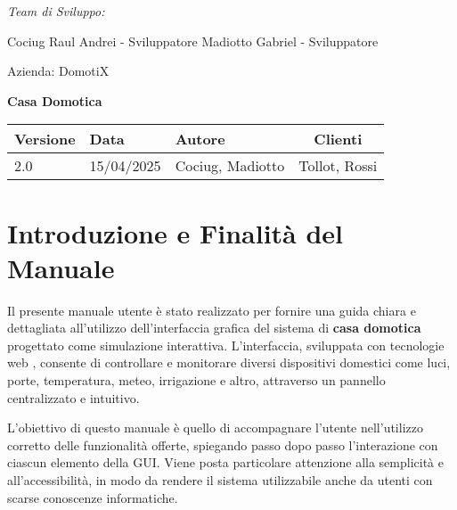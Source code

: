 \documentclass[a4paper,12pt]{article}
\begin{document}
\begin{titlepage}
    \begin{minipage}[t]{0.4\textwidth}
    \raggedright
    {\large\itshape Team di Sviluppo:\par}
    \vspace{0.2cm}
    
    Cociug Raul Andrei - Sviluppatore 
    Madiotto Gabriel - Sviluppatore
    \end{minipage}
    \hfill
    \begin{minipage}[t]{0.4\textwidth}
    \raggedleft
    {\Large Azienda: DomotiX\par}
    \end{minipage}
    
    \centering
    \vspace*{5cm}
    
    {\Huge\bfseries Casa Domotica\par}
    \vspace{1.5cm}
    
    \vfill
    
    \begin{table}[h]
    \centering
    \begin{tabular}{@{}lllc@{}}
    \toprule
    Versione & Data & Autore & Clienti \\  
    \midrule
    2.0 & 15/04/2025 & Cociug, Madiotto & Tollot, Rossi \\
    \bottomrule
    \end{tabular}
    \end{table}
    
    \thispagestyle{empty}
\end{titlepage}
\tableofcontents
\newpage

\section{Introduzione e Finalità del Manuale}

Il presente manuale utente è stato realizzato per fornire una guida chiara e dettagliata all'utilizzo dell’interfaccia grafica del sistema di \textbf{casa domotica} progettato come simulazione interattiva. L’interfaccia, sviluppata con tecnologie web , consente di controllare e monitorare diversi dispositivi domestici come luci, porte, temperatura, meteo, irrigazione e altro, attraverso un pannello centralizzato e intuitivo.

L’obiettivo di questo manuale è quello di accompagnare l’utente nell’utilizzo corretto delle funzionalità offerte, spiegando passo dopo passo l’interazione con ciascun elemento della GUI. Viene posta particolare attenzione alla semplicità e all’accessibilità, in modo da rendere il sistema utilizzabile anche da utenti con scarse conoscenze informatiche.
\end{document}
